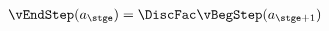   \begin{equation}\begin{gathered}\begin{aligned}
    \vEndStep({a}_{\stge})  & = \DiscFac \vBegStep({a}_{\stge+1})  \label{eq:vEndtdefn}
  \end{aligned}\end{gathered}\end{equation} 
